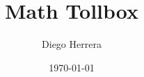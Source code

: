 %
\author[Diego Herrera]{Diego Herrera}
\title[Toolbox]{Math Tollbox}
\date{\today}
%
%
\makeatletter
{}
\makeatother
%
\renewcommand{\PrelimWords}
    {MTBox -- D. Herrera -- Version 1.0.0}
%
